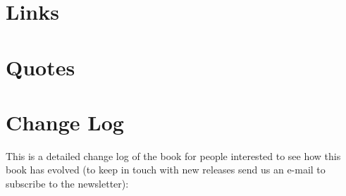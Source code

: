\documentclass[12pt,a4paper,twoside,openright]{report}
\theoremstyle{definition}
\theoremstyle{itexmp}
\numberwithin{equation}{section}
\begin{document}
 	\chapter{Links}
	

			
	\chapter{Quotes}
	
	
 	
 	\chapter{Change Log}\label{change log}

This is a detailed change log of the book for people interested to see how this book has evolved (to keep in touch with new releases send us an e-mail to subscribe to the newsletter):
\end{document}
